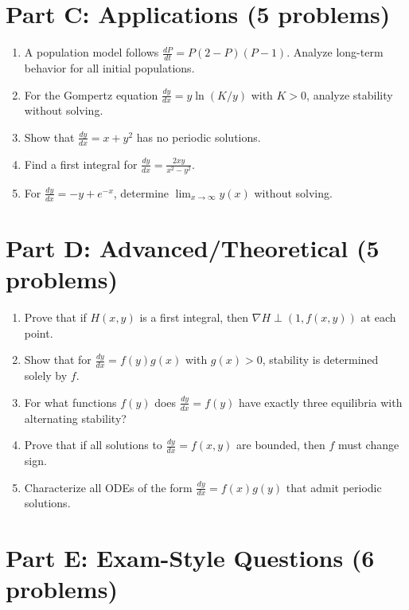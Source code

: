 \documentclass[12pt]{article}
\begin{document}
\section*{Part C: Applications (5 problems)}

\begin{enumerate}[resume]
\item A population model follows $\frac{dP}{dt} = P(2 - P)(P - 1)$. Analyze long-term behavior for all initial populations.

\item For the Gompertz equation $\frac{dy}{dx} = y\ln(K/y)$ with $K > 0$, analyze stability without solving.

\item Show that $\frac{dy}{dx} = x + y^2$ has no periodic solutions.

\item Find a first integral for $\frac{dy}{dx} = \frac{2xy}{x^2 - y^2}$.

\item For $\frac{dy}{dx} = -y + e^{-x}$, determine $\lim_{x \to \infty} y(x)$ without solving.
\end{enumerate}

\section*{Part D: Advanced/Theoretical (5 problems)}

\begin{enumerate}[resume]
\item Prove that if $H(x,y)$ is a first integral, then $\nabla H \perp (1, f(x,y))$ at each point.

\item Show that for $\frac{dy}{dx} = f(y)g(x)$ with $g(x) > 0$, stability is determined solely by $f$.

\item For what functions $f(y)$ does $\frac{dy}{dx} = f(y)$ have exactly three equilibria with alternating stability?

\item Prove that if all solutions to $\frac{dy}{dx} = f(x,y)$ are bounded, then $f$ must change sign.

\item Characterize all ODEs of the form $\frac{dy}{dx} = f(x)g(y)$ that admit periodic solutions.
\end{enumerate}

\section*{Part E: Exam-Style Questions (6 problems)}
\end{document}
